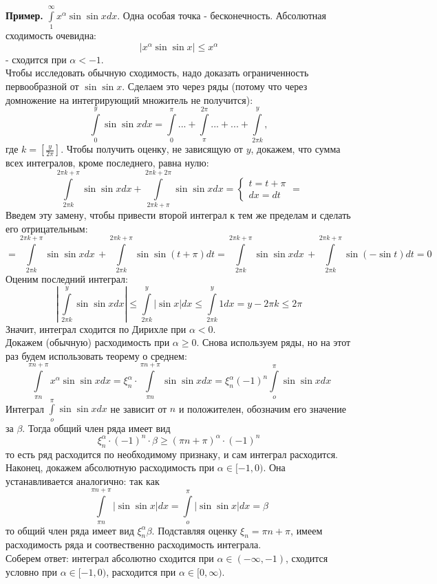 \textbf{Пример.} $\int\limits_{1}^{\infty}x^\alpha\sin\sin xdx$. Одна особая
точка - бесконечность. Абсолютная сходимость очевидна:
$$|x^\alpha\sin\sin x|\leqslant x^\alpha$$
- сходится при $\alpha<-1$.\\
Чтобы исследовать обычную сходимость, надо доказать ограниченность 
первообразной от $\sin\sin x$. Сделаем это через ряды (потому что через
домножение на интегрирующий множитель не получится):
$$\int\limits_{0}^{y} \sin\sin x dx=\int\limits_{0}^{\pi}...+
\int\limits_{\pi}^{2\pi}...+...+\int\limits_{2\pi k}^{y},$$ 
где $k=\left[ \frac{y}{2\pi} \right]$. Чтобы получить оценку, не зависящую 
от $y$, докажем, что сумма всех интегралов, кроме последнего, равна нулю:
$$\int\limits_{2\pi k}^{2\pi k+\pi}\sin\sin xdx+
\int\limits_{2\pi k+\pi}^{2\pi k+2\pi}\sin\sin xdx=
\begin{cases}t=t+\pi\\dx=dt\end{cases}=$$
Введем эту замену, чтобы привести второй интеграл к тем же пределам и 
сделать его отрицательным:
$$=\int\limits_{2\pi k}^{2\pi k+\pi}\sin\sin xdx\,+
\int\limits_{2\pi k}^{2\pi k+\pi}\sin\sin (t+\pi)dt=
\int\limits_{2\pi k}^{2\pi k+\pi}\sin\sin xdx\,+
\int\limits_{2\pi k}^{2\pi k+\pi}\sin(-\sin t) dt=0$$
Оценим последний интеграл:
$$\left|\,\int\limits_{2\pi k}^{y}\sin\sin xdx\right| \leqslant 
\int\limits_{2\pi k}^{y}|\sin x|dx\leqslant \int\limits_{2\pi k}^{y}1dx=
y-2\pi k\leqslant 2\pi$$
Значит, интеграл сходится по Дирихле при $\alpha<0$.\\
Докажем (обычную) расходимость при $\alpha\geqslant 0$. 
Снова используем ряды, но на 
этот раз будем использовать теорему о среднем:
$$\int\limits_{\pi n}^{\pi n+\pi}x^\alpha\sin\sin xdx=\xi^\alpha_n\cdot 
\int\limits_{\pi n}^{\pi n+\pi}\sin\sin xdx=\xi^\alpha_n(-1)^n
 \int\limits_{o}^{\pi}\sin\sin xdx$$
Интеграл $\int\limits_{o}^{\pi}\sin\sin xdx$ не зависит от  $n$ и положителен, 
обозначим его значение за  $\beta$. Тогда общий член ряда имеет вид
$$\xi^\alpha_n\cdot (-1)^n\cdot\beta\geqslant (\pi n+\pi)^\alpha\cdot(-1)^n$$
то есть ряд расходится по необходимому признаку, и сам интеграл расходится.\\
Наконец, докажем абсолютную расходимость при $\alpha\in[-1,0)$. Она 
устанавливается аналогично: так как
$$\int\limits_{\pi n}^{\pi n+\pi}|\sin\sin x|dx=
 \int\limits_{o}^{\pi}|\sin\sin x|dx=\beta$$
 то общий член ряда имеет вид $\xi^\alpha_n\beta$. Подставляя оценку
 $\xi_n=\pi n+\pi$, имеем расходимость ряда и соотвественно расходимость 
 интеграла.\\
Соберем ответ: интеграл абсолютно сходится при $\alpha\in (-\infty,-1)$,
сходится условно при $\alpha\in [-1,0)$, расходится при 
$\alpha\in [0,\infty)$. 

